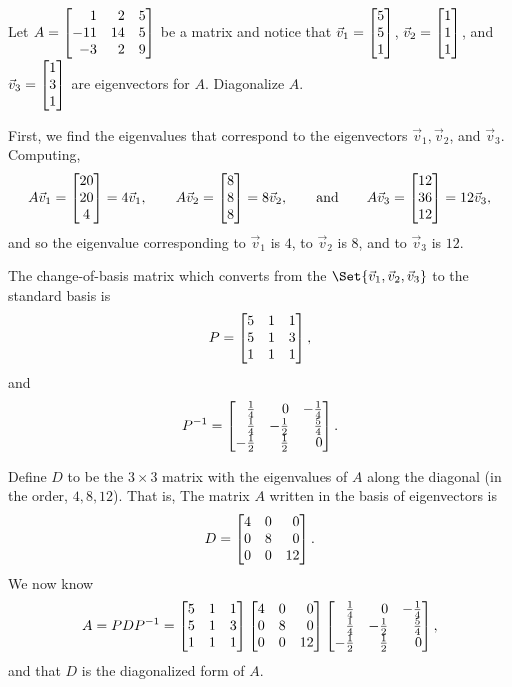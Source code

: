 \begin{example}
	Let $A=\mat{1&2&5\\-11&14&5\\-3&2&9}$ be a matrix and notice that $\vec v_1=\mat{5\\5\\1}$, $\vec v_2=\mat{1\\1\\1}$,
	and $\vec v_3=\mat{1\\3\\1}$ are eigenvectors for $A$. Diagonalize $A$.

	First, we find the eigenvalues that correspond to the eigenvectors $\vec v_1, \vec v_2$, 
	and $\vec v_3$. Computing,
	\[
A\vec v_1=\matc{20\\20\\4}=4\vec v_1,\qquad A\vec v_2=\mat{8\\8\\8}=8\vec v_2,\qquad\text{and}\qquad
	A\vec v_3=\mat{12\\36\\12}=12\vec v_3, \]
	and so the eigenvalue corresponding to $\vec v_1$ is $4$, to $\vec v_2$ is $8$, 
	and to $\vec v_3$ is $12$.
	
	The change-of-basis matrix which converts from the $\Set{\vec v_1,\vec v_2,\vec v_3}$ to the standard basis is
	\[
		P = \mat{5&1&1\\5&1&3\\1&1&1},
	\]
	and
	\[
		P^{-1} = \mat{\frac{1}{4}&0&-\frac{1}{4}\\\frac{1}{4}&-\frac{1}{2}&\frac{5}{4}\\-\frac{1}{2}&\frac{1}{2}&0}.
	\]

	Define $D$ to be the $3\times 3$ matrix with the eigenvalues of $A$ along the diagonal (in the order, $4,8,12$). That is,
	The matrix $A$ written in the basis of eigenvectors is
	\[
		D = \mat{4&0&0\\0&8&0\\0&0&12}.
	\]
	We now know
	\[
		A = PDP^{-1}= \mat{5&1&1\\5&1&3\\1&1&1}\mat{4&0&0\\0&8&0\\0&0&12}
		\mat{\frac{1}{4}&0&-\frac{1}{4}\\\frac{1}{4}&-\frac{1}{2}&\frac{5}{4}\\-\frac{1}{2}&\frac{1}{2}&0},
	\]
	and that $D$ is the diagonalized form of $A$.
\end{example}

